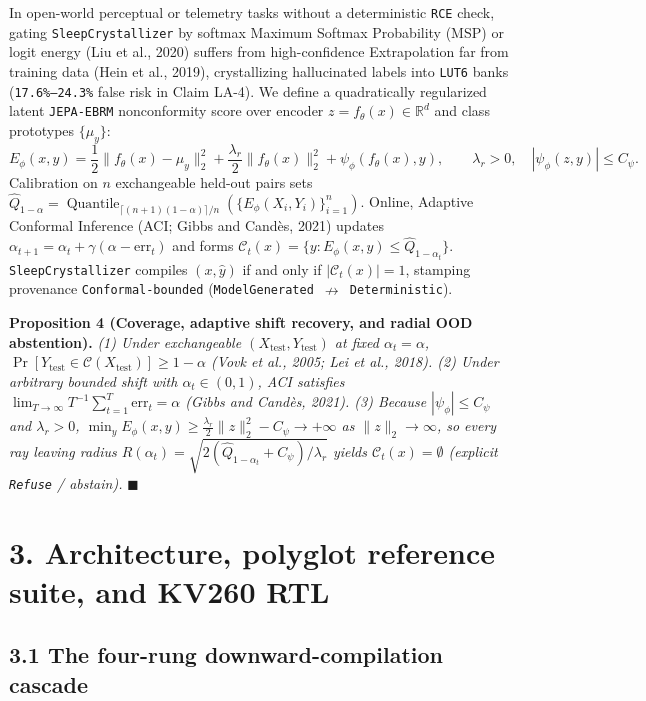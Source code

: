 \documentclass[10pt]{article}
\begin{document}
In open-world perceptual or telemetry tasks without a deterministic \texttt{RCE} check, gating \texttt{SleepCrystallizer} by softmax Maximum Softmax Probability (MSP) or logit energy (Liu et al., 2020) suffers from high-confidence Extrapolation far from training data (Hein et al., 2019), crystallizing hallucinated labels into \texttt{LUT6} banks (\texttt{17.6\%--24.3\%} false risk in Claim LA-4). We define a quadratically regularized latent \texttt{JEPA-EBRM} nonconformity score over encoder $z = f_\theta(x) \in \mathbb{R}^d$ and class prototypes $\{\mu_y\}$:
\[
  E_\phi(x, y) = \frac{1}{2}\|f_\theta(x) - \mu_y\|_2^2 + \frac{\lambda_r}{2}\|f_\theta(x)\|_2^2 + \psi_\phi(f_\theta(x), y), \qquad \lambda_r > 0, \quad |\psi_\phi(z,y)| \le C_\psi.
\]
Calibration on $n$ exchangeable held-out pairs sets $\hat{Q}_{1-\alpha} = \operatorname{Quantile}_{\lceil (n+1)(1-\alpha) \rceil / n}(\{E_\phi(X_i, Y_i)\}_{i=1}^n)$. Online, Adaptive Conformal Inference (ACI; Gibbs and Cand\`es, 2021) updates $\alpha_{t+1} = \alpha_t + \gamma(\alpha - \text{err}_t)$ and forms $\mathcal{C}_t(x) = \{y : E_\phi(x, y) \le \hat{Q}_{1-\alpha_t}\}$. \texttt{SleepCrystallizer} compiles $(x, \hat{y})$ if and only if $|\mathcal{C}_t(x)| = 1$, stamping provenance \texttt{Conformal-bounded} (\texttt{ModelGenerated $\nrightarrow$ Deterministic}).

\textbf{Proposition 4 (Coverage, adaptive shift recovery, and radial OOD abstention).}
\emph{(1) Under exchangeable $(X_{\text{test}}, Y_{\text{test}})$ at fixed $\alpha_t=\alpha$, $\Pr[Y_{\text{test}} \in \mathcal{C}(X_{\text{test}})] \ge 1 - \alpha$ (Vovk et al., 2005; Lei et al., 2018). (2) Under arbitrary bounded shift with $\alpha_t \in (0,1)$, ACI satisfies $\lim_{T\to\infty} T^{-1}\sum_{t=1}^T \text{err}_t = \alpha$ (Gibbs and Cand\`es, 2021). (3) Because $|\psi_\phi| \le C_\psi$ and $\lambda_r > 0$, $\min_y E_\phi(x,y) \ge \frac{\lambda_r}{2}\|z\|_2^2 - C_\psi \to +\infty$ as $\|z\|_2 \to \infty$, so every ray leaving radius $R(\alpha_t) = \sqrt{2(\hat{Q}_{1-\alpha_t} + C_\psi)/\lambda_r}$ yields $\mathcal{C}_t(x) = \emptyset$ (explicit \texttt{Refuse} / abstain).} $\blacksquare$

\section{3. Architecture, polyglot reference suite, and KV260 RTL}\label{architecture}

\subsection{3.1 The four-rung downward-compilation cascade}\label{cascade-arch}
\end{document}
